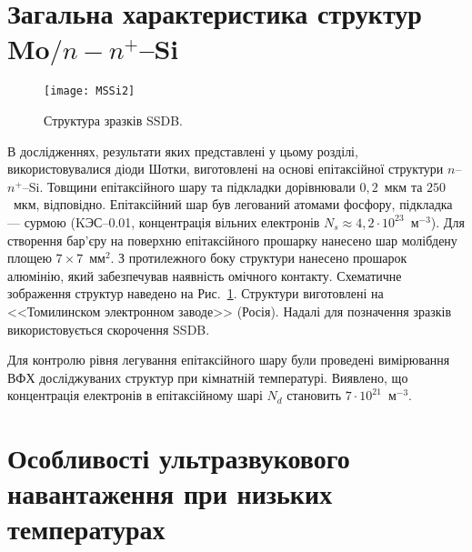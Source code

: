 \documentclass[a4paper,14pt,oneside,openany]{memoir}
\begin{document}
\section{Загальна характеристика структур Mo$/n-n^+$--Si\label{SSDB:Struc}}



\begin{figure}[b]
\center
\texttt{[image: MSSi2]}%
\caption{\label{figMSSi2}
Структура зразків SSDB.
}
\end{figure}


В дослідженнях, результати яких представлені у цьому розділі, використовувалися діоди Шотки, виготовлені на основі епітаксійної
структури $n$--$n^+$--Si.
Товщини епітаксійного шару та підкладки дорівнювали $0,2$~мкм та $250$~мкм, відповідно.
Епітаксійний шар був легований атомами фосфору, підкладка --- сурмою
(KЭС--0.01, концентрація вільних електронів $N_s\approx4,2\cdot10^{23}$~м$^{-3}$).
Для створення бар'єру на поверхню епітаксійного прошарку нанесено шар молібдену площею $7\times7$~мм$^2$.
З протилежного боку структури нанесено прошарок алюмінію, який забезпечував наявність омічного контакту.
Схематичне зображення структур наведено на Рис.~\ref{figMSSi2}.
Структури виготовлені на <<Томилинском электронном заводе>>  (Росія).
Надалі для позначення зразків використовується скорочення SSDB.

Для контролю рівня легування епітаксійного шару були проведені
вимірювання ВФХ досліджуваних структур при кімнатній температурі.
Виявлено, що концентрація електронів в епітаксійному шарі $N_d$ становить $7\cdot10^{21}$~м$^{-3}$.



\section{Особливості ультразвукового навантаження при низьких температурах\label{SSDB:USL}}
\end{document}
